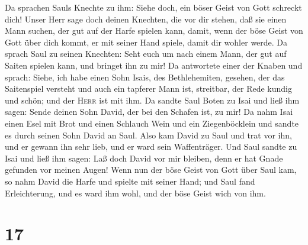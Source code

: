  Da sprachen Sauls Knechte zu ihm: Siehe doch, ein böser
Geist von Gott schreckt dich!  Unser Herr sage doch
deinen Knechten, die vor dir stehen, daß sie einen Mann suchen, der gut
auf der Harfe spielen kann, damit, wenn der böse Geist von Gott über
dich kommt, er mit seiner Hand spiele, damit dir wohler werde.
 Da sprach Saul zu seinen Knechten: Seht euch um nach
einem Mann, der gut auf Saiten spielen kann, und bringet ihn zu mir!
 Da antwortete einer der Knaben und sprach: Siehe, ich
habe einen Sohn Isais, des Bethlehemiten, gesehen, der das Saitenspiel
versteht und auch ein tapferer Mann ist, streitbar, der Rede kundig und
schön; und der \textsc{Herr} ist mit ihm.  Da sandte Saul
Boten zu Isai und ließ ihm sagen: Sende deinen Sohn David, der bei den
Schafen ist, zu mir!  Da nahm Isai einen Esel mit Brot
und einen Schlauch Wein und ein Ziegenböcklein und sandte es durch
seinen Sohn David an Saul.  Also kam David zu Saul und
trat vor ihn, und er gewann ihn sehr lieb, und er ward sein
Waffenträger.  Und Saul sandte zu Isai und ließ ihm
sagen: Laß doch David vor mir bleiben, denn er hat Gnade gefunden vor
meinen Augen!  Wenn nun der böse Geist von Gott über Saul
kam, so nahm David die Harfe und spielte mit seiner Hand; und Saul fand
Erleichterung, und es ward ihm wohl, und der böse Geist wich von ihm.

\hypertarget{section-16}{%
\section{17}\label{section-16}}

